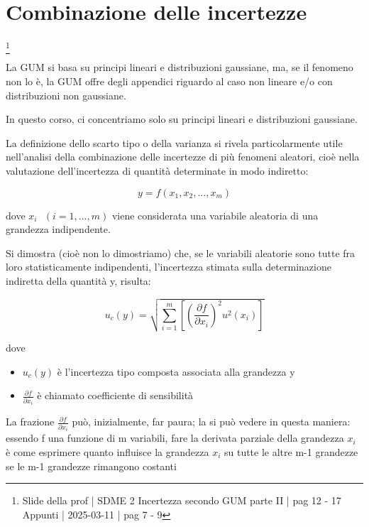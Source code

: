 \newpage 

\section{Combinazione delle incertezze}
\footnote{Slide della prof | SDME 2 Incertezza secondo GUM parte II | pag 12 - 17 \\  
Appunti | 2025-03-11 | pag 7 - 9}

La GUM si basa su principi lineari e distribuzioni gaussiane, ma, se il fenomeno non lo è, 
la GUM offre degli appendici riguardo al caso non lineare e/o con distribuzioni non gaussiane. \newline 

In questo corso, ci concentriamo solo su principi lineari e distribuzioni gaussiane. \newline 

La definizione dello scarto tipo o della varianza si rivela particolarmente utile nell'analisi 
della combinazione delle incertezze di più fenomeni aleatori, 
cioè nella valutazione dell'incertezza di quantità determinate in modo indiretto: 

{ 
    \Large 
    \begin{equation}
        y = f(x_1, x_2, ..., x_m)
    \end{equation}
}

dove $x_i \text{ } (i = 1, ..., m)$ viene considerata una variabile aleatoria di una grandezza indipendente. \newline 

Si dimostra (cioè non lo dimostriamo) che, se le variabili aleatorie sono tutte fra loro statisticamente indipendenti, 
l'incertezza stimata sulla determinazione indiretta della quantità y, risulta: 

{
    \Large 
    \begin{equation}
        u_c (y) = \sqrt{\sum_{i = 1}^{m} \left[ \left( \frac{\partial f}{\partial x_i} \right) ^{2} u^{2} (x_i)\right]}
    \end{equation}
}

dove 

\begin{itemize}
    \item $u_c (y)$ è l'incertezza tipo composta associata alla grandezza y 
    \item $\frac{\partial f}{\partial x_i}$ è chiamato coefficiente di sensibilità
\end{itemize}

\begin{tcolorbox}
    La frazione $\frac{\partial f}{\partial x_i}$ può, inizialmente, far paura; la si può vedere in questa maniera: \\
    essendo f una funzione di m variabili, fare la derivata parziale della grandezza $x_i$ è come esprimere quanto influisce la grandezza $x_i$ su tutte le altre m-1 grandezze 
    se le m-1 grandezze rimangono costanti
\end{tcolorbox}

